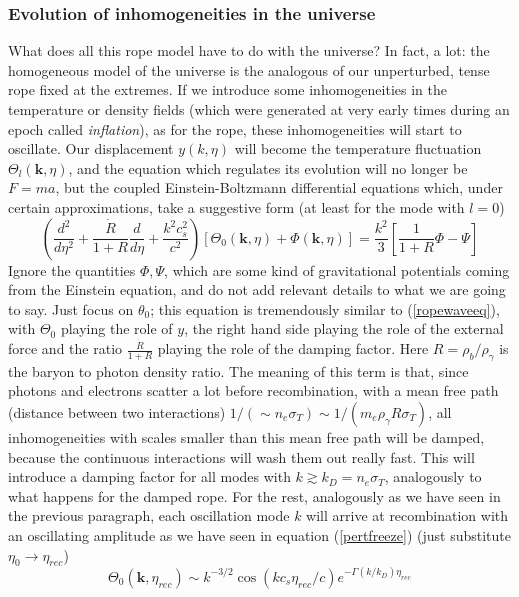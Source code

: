 \documentclass[11pt, a4paper,oneside,openright]{book}
\numberwithin{equation}{section}
\begin{document}
\subsubsection{Evolution of inhomogeneities in the universe}
What does all this rope model have to do with the universe? In fact, a lot: the homogeneous model of the universe is the analogous of our unperturbed, tense rope fixed at the extremes. If we introduce some inhomogeneities in the temperature or density fields (which were generated at very early times during an epoch called \textit{inflation}), as for the rope, these inhomogeneities will start to oscillate. Our displacement $y(k,\eta)$ will become the temperature fluctuation $\Theta_l(\mathbf{k},\eta)$, and the equation which regulates its evolution will no longer be $F=ma$, but the coupled Einstein-Boltzmann differential equations which, under certain approximations, take a suggestive form (at least for the mode with $l=0$)
\begin{equation}
\label{monopolepert}
\left(\frac{d^2}{d\eta^2}+\frac{\dot{R}}{1+R}\frac{d}{d\eta}+\frac{k^2c_s^2}{c^2}\right)[\Theta_0(\mathbf{k},\eta)+\Phi(\mathbf{k},\eta)]=\frac{k^2}{3}\left[\frac{1}{1+R}\Phi -\Psi\right]
\end{equation}  
Ignore the quantities $\Phi,\Psi$, which are some kind of gravitational potentials coming from the Einstein equation, and do not add relevant details to what we are going to say. Just focus on $\theta_0$; this equation is tremendously similar to (\ref{ropewaveeq}), with $\Theta_0$ playing the role of $y$, the right hand side playing the role of the external force and the ratio $\frac{\dot{R}}{1+R}$ playing the role of the damping factor. Here $R=\rho_b/\rho_\gamma$ is the baryon to photon density ratio. The meaning of this term is that, since photons and electrons scatter a lot before recombination, with a mean free path (distance between two interactions) $1/(\sim n_e \sigma_T)\sim 1/(m_e\rho_\gamma R\sigma_T)$, all inhomogeneities with scales smaller than this mean free path will be damped, because the continuous interactions will wash them out really fast. This will introduce a damping factor for all modes with $k\gtrsim k_D=n_e\sigma_T$, analogously to what happens for the damped rope. For the rest, 
analogously as we have seen in the previous paragraph, each oscillation mode $k$ will arrive at recombination with an oscillating amplitude as we have seen in equation (\ref{pertfreeze}) (just substitute $\eta_0\rightarrow \eta_{rec}$) 
\begin{equation}
\label{solmonop}
\Theta_0(\mathbf{k},\eta_{rec})\sim k^{-3/2} \cos{(kc_s\eta_{rec}/c)}e^{-\Gamma(k/k_D)\eta_{rec}}
\end{equation}
\end{document}
